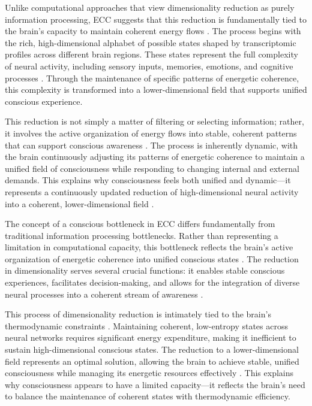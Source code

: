 \begin{refsection}
Unlike computational approaches that view dimensionality reduction as purely information processing, ECC suggests that this reduction is fundamentally tied to the brain's capacity to maintain coherent energy flows \cite{dehaene2011experimental}. The process begins with the rich, high-dimensional alphabet of possible states shaped by transcriptomic profiles across different brain regions. These states represent the full complexity of neural activity, including sensory inputs, memories, emotions, and cognitive processes \cite{bayne2010unity}. Through the maintenance of specific patterns of energetic coherence, this complexity is transformed into a lower-dimensional field that supports unified conscious experience.

This reduction is not simply a matter of filtering or selecting information; rather, it involves the active organization of energy flows into stable, coherent patterns that can support conscious awareness \cite{mashour2020conscious}. The process is inherently dynamic, with the brain continuously adjusting its patterns of energetic coherence to maintain a unified field of consciousness while responding to changing internal and external demands. This explains why consciousness feels both unified and dynamic—it represents a continuously updated reduction of high-dimensional neural activity into a coherent, lower-dimensional field \cite{carhart2014entropic}.

The concept of a conscious bottleneck in ECC differs fundamentally from traditional information processing bottlenecks. Rather than representing a limitation in computational capacity, this bottleneck reflects the brain's active organization of energetic coherence into unified conscious states \cite{bayne2003what}. The reduction in dimensionality serves several crucial functions: it enables stable conscious experiences, facilitates decision-making, and allows for the integration of diverse neural processes into a coherent stream of awareness \cite{dainton2006stream}.

This process of dimensionality reduction is intimately tied to the brain's thermodynamic constraints \cite{hameroff2014consciousness}. Maintaining coherent, low-entropy states across neural networks requires significant energy expenditure, making it inefficient to sustain high-dimensional conscious states. The reduction to a lower-dimensional field represents an optimal solution, allowing the brain to achieve stable, unified consciousness while managing its energetic resources effectively \cite{koch2017can}. This explains why consciousness appears to have a limited capacity—it reflects the brain's need to balance the maintenance of coherent states with thermodynamic efficiency.


\end{refsection}
